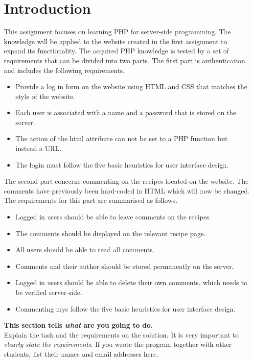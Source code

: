 \documentclass[a4paper]{scrartcl}
\begin{document}
\section{Introduction}

This assignment focuses on learning PHP for server-side programming. The knowledge will be applied to the website created in the first assignment to expand its functionality. The acquired PHP knowledge is tested by a set of requirements that can be divided into two parts. The first part is authentication and includes the following requirements.
\begin{itemize}
    \item Provide a log in form on the website using HTML and CSS that matches the style of the website.
    \item Each user is associated with a name and a password that is stored on the server.
    \item The action of the html attribute can not be set to a PHP function but instead a URL.
    \item The login must follow the five basic heuristics for user interface design. 
\end{itemize}

The second part concerns commenting on the recipes located on the website. The comments have previously been hard-coded in HTML which will now be changed. The requirements for this part are summarised as follows.
\begin{itemize}
    \item Logged in users should be able to leave comments on the recipes.
    \item The comments should be displayed on the relevant recipe page.
    \item All users should be able to read all comments.
    \item Comments and their author should be stored permanently on the server.
    \item Logged in users should be able to delete their own comments, which needs to be verified server-side.
    \item Commenting mys follow the five basic heuristics for user interface design.
\end{itemize}

\textbf{This section tells \textit{what} are you going to do.} \\

\noindent Explain the task and the requirements on the solution. It is very important to \textit{clearly state the requirements}. If you wrote the program together with other students, list their names and email addresses here.
\end{document}
